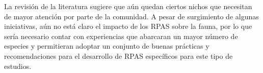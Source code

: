 \documentclass[onecolumn]{extarticle}
\begin{document}
La revisión de la literatura sugiere que aún quedan ciertos nichos que
necesitan de mayor atención por parte de la comunidad. A pesar de
surgimiento de algunas iniciativas, aún no está claro el impacto de los
RPAS sobre la fauna, por lo que sería necesario contar con experiencias
que abarcaran un mayor número de especies y permitieran adoptar un
conjunto de buenas prácticas y recomendaciones para el desarrollo de
RPAS específicos para este tipo de estudios.

\newpage
\singlespacing 

\end{document}
